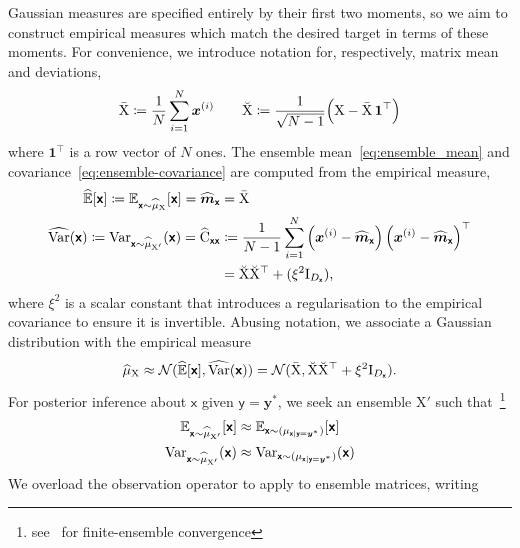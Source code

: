 \documentclass[wcp]{jmlr} %
\newcommand{\Ex}{\mathbb{E}}
\newcommand{\var}{\operatorname{Var}}
\newcommand{\vv}[1]{\boldsymbol{#1}}
\newcommand{\mm}[1]{\mathrm{#1}}
\newcommand{\mmmean}[1]{\bar{\mathrm{#1}}}
\newcommand{\mmdev}[1]{\breve{\mathrm{#1}}}
\newcommand{\rv}[1]{\mathsf{#1}}
\newcommand{\vrv}[1]{\vv{\rv{#1}}}
\newcommand{\Normal}{\mathcal{N}}
\newcommand{\gvn}{\mid}
\begin{document}
Gaussian measures are specified entirely by their first two moments, so we aim to construct empirical measures which match the desired target in terms of these moments.
For convenience, we introduce notation for, respectively, matrix mean and deviations,
\begin{align}
    \mmmean{X} \coloneq \frac{1}{N}\sum_{i=1}^N \vv{x}^{(i)}
    \quad\quad
    \mmdev{X} \coloneq \frac{1}{\sqrt{N-1}} \Bigl( \mm{X} - \mmmean{X}\,\vv{1}^\top \Bigr)
     \label{eq:deviation_matrix}
\end{align}
where \(\vv{1}^\top\) is a row vector of \(N\) ones.
The ensemble mean~\eqref{eq:ensemble_mean} and covariance~\eqref{eq:ensemble-covariance} are computed from the empirical measure,
\begin{align}
    \widehat{\Ex}[\vrv{x}]\coloneq \Ex_{\vrv{x}\sim \ELaw[\mm{X}]}[ \vrv{x}] =\widehat{\vv{m}}_{\vrv{x}}
&=\mmmean{X}\label{eq:ensemble_mean} \\
\widehat{\var}(\vrv{x}) \coloneq\var_{\vrv{x}\sim \ELaw[\mm{X}']} (\vrv{x})=\widehat{\mm{C}}_{\vrv{xx}} &\coloneq \frac{1}{N-1} \sum_{i=1}^{N} \left(\vv{x}^{(i)} - \widehat{\vv{m}}_{\vrv{x}}\right)\left(\vv{x}^{(i)} - \widehat{\vv{m}}_{\vrv{x}}\right)^\top  \\
&=\mmdev{X} \mmdev{X}^\top + (\xi^2\mm{I}_{D_{\vrv{x}}}),\label{eq:ensemble-covariance}
\end{align}
where \(\xi^2\) is a scalar constant that introduces a regularisation to the empirical covariance to ensure it is invertible.
Abusing notation, we associate a Gaussian distribution with the empirical measure
\begin{align}
\ELaw[\mm{X}] \approx \Normal(\widehat{\Ex}[\vrv{x}], \widehat{\var}(\vrv{x})) = \Normal(\mmmean{X}, \mmdev{X} \mmdev{X}^\top + \xi^2\mm{I}_{D_{\vrv{x}}}).
\end{align}
For posterior inference about $\vrv{x}$ given $\vrv{y}=\vv{y}^*$, we seek an ensemble $\mm{X}'$ such that~\footnote{see~\cite{LeGland2009Large,Mandel2011Convergence,Kelly2014Wellposedness,Kwiatkowski2015Convergence,DelMoral2017Stability} for finite-ensemble convergence}
\begin{align}
    \Ex_{\vrv{x}\sim \ELaw[\mm{X}']}[ \vrv{x}] &\approx \Ex_{\vrv{x}\sim (\Law[\vrv{x} \gvn \vrv{y}=\vv{y}^*])} [\vrv{x}]\\
    \var_{\vrv{x}\sim \ELaw[\mm{X}']} (\vrv{x}) &\approx \var_{\vrv{x}\sim (\Law[\vrv{x} \gvn \vrv{y}=\vv{y}^*])} (\vrv{x})
\end{align}
We overload the observation operator to apply to ensemble matrices, writing
\end{document}
